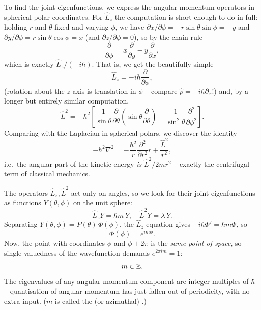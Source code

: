 \documentclass[a4paper]{scrartcl}
\begin{document}
To find the joint eigenfunctions, we express the angular momentum operators in spherical polar coordinates. For $\hat{L}_z$ the computation is short enough to do in full: holding $r$ and $\theta$ fixed and varying $\phi$, we have $\partial x/\partial \phi = -r\sin\theta\sin\phi = -y$ and $\partial y / \partial \phi = r \sin\theta\cos\phi = x$ (and $\partial z/\partial\phi = 0$), so by the chain rule
$$
\frac{\partial}{\partial \phi} = x \frac{\partial}{\partial y} - y \frac{\partial}{\partial x},
$$
which is exactly $\hat{L}_z / (-i\hbar)$. That is, we get the beautifully simple
$$
\hat{L}_z = -i\hbar \frac{\partial}{\partial \phi},
$$
(rotation about the $z$-axis is translation in $\phi$ -- compare $\hat p = -i\hbar\partial_x$!) and, by a longer but entirely similar computation,
$$
\hat{L}^2 = -\hbar^2 \left[ \frac{1}{\sin\theta} \frac{\partial}{\partial \theta}\left( \sin \theta \frac{\partial}{\partial \theta} \right) + \frac{1}{\sin^2\theta} \frac{\partial^2}{\partial \phi^2} \right].
$$
Comparing with the Laplacian in spherical polars, we discover the identity
$$
-\hbar^2 \nabla^2 = -\frac{\hbar^2}{r}\frac{\partial^2}{\partial r^2} r + \frac{\hat{L}^2}{r^2},
$$
i.e.\ the angular part of the kinetic energy \emph{is} $\hat{L}^2 / 2mr^2$ -- exactly the centrifugal term of classical mechanics.

The operators $\hat L_z, \hat L^2$ act only on angles, so we look for their joint eigenfunctions as functions $Y(\theta, \phi)$ on the unit sphere:
$$
\hat{L}_z Y = \hbar m \, Y, \quad \hat{L}^2 Y = \lambda \, Y.
$$
Separating $Y(\theta, \phi) = P(\theta) \, \Phi(\phi)$, the $\hat{L}_z$ equation gives $-i\hbar \Phi' = \hbar m \Phi$, so
$$
\Phi(\phi) = e^{i m \phi}.
$$
Now, the point with coordinates $\phi$ and $\phi + 2\pi$ is the \emph{same point of space}, so single-valuedness of the wavefunction demands $e^{2\pi i m} = 1$:
$$
m \in \mathbb{Z}.
$$
The eigenvalues of any angular momentum component are integer multiples of $\hbar$ -- quantisation of angular momentum has just fallen out of periodicity, with no extra input. ($m$ is called the  (or azimuthal) .)
\end{document}
